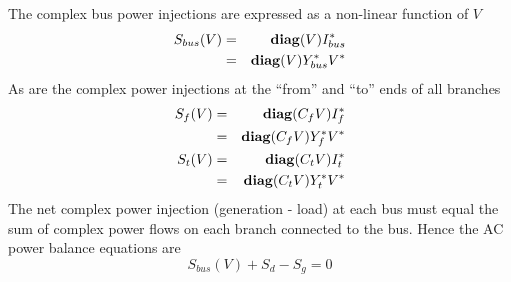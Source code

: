 The complex bus power injections are expressed as a non-linear function of $V$
\begin{eqnarray}
S_{bus}(V)& =& \mathop{\mathbf{diag}}(V)I_{bus}^* \nonumber \\
\label{eq:sbus}
&= & \mathop{\mathbf{diag}}(V)Y_{bus}^*V^*
\end{eqnarray}
As are the complex power injections at the ``from'' and ``to'' ends of all
branches
\begin{eqnarray}
S_{f}(V)& =& \mathop{\mathbf{diag}}(C_fV)I_f^* \nonumber \\
\label{eq:sf_loss}
& =& \mathop{\mathbf{diag}}(C_fV)Y_f^*V^*\\
S_{t}(V)& =& \mathop{\mathbf{diag}}(C_tV)I_t^* \nonumber \\
\label{eq:st_loss}
& =& \mathop{\mathbf{diag}}(C_tV)Y_t^*V^*
\end{eqnarray}
The net complex power injection (generation - load) at each bus must equal the
sum of complex power flows on each branch connected to the bus.  Hence the AC
power balance equations are
\begin{equation}
\label{eq:mismatch}
S_{bus}(V) + S_d - S_g = 0
\end{equation}

